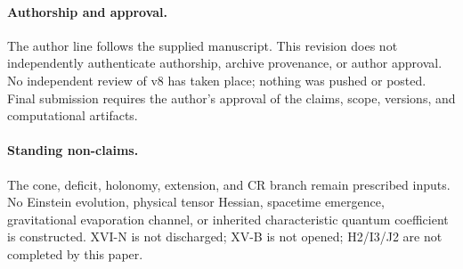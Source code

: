 \documentclass[11pt,a4paper]{article}
\theoremstyle{plain}
\theoremstyle{definition}
\theoremstyle{remark}
\numberwithin{equation}{section}
\begin{document}
\paragraph{Authorship and approval.}
The author line follows the supplied manuscript.
This revision does not independently authenticate authorship,
archive provenance, or author approval.
No independent review of v8 has taken place; nothing was pushed
or posted. Final submission requires the author's approval of the claims,
scope, versions, and computational artifacts.

\paragraph{Standing non-claims.}
The cone, deficit, holonomy, extension, and CR branch remain
prescribed inputs. No Einstein evolution, physical tensor
Hessian, spacetime emergence, gravitational evaporation channel,
or inherited characteristic quantum coefficient is constructed.
XVI-N is not discharged; XV-B is not opened; H2/I3/J2 are not
completed by this paper.
\end{document}
